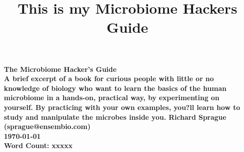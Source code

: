 
   \begin{titlepage}
     \centering
     \vspace*{11\baselineskip}
     \large
     \bfseries
     The Microbiome Hacker's Guide \\[5\baselineskip]
     \normalfont
     \small
     A brief excerpt of a book for curious people with little or no knowledge of biology who want to learn the basics of the human microbiome in a hands-on, practical way, by experimenting on yourself. By practicing with your own examples, you?ll learn how to study and manipulate the microbes inside you.     \vfill
     Richard Sprague \\
     (sprague@ensembio.com) \\[2\baselineskip]
     \textbf{\today} \\[2\baselineskip]
     Word Count: {\color{red}xxxxx}
   \end{titlepage}
\title{This is my Microbiome Hackers Guide}
